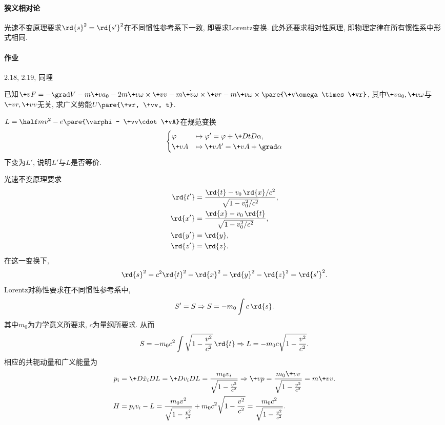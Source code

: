 \documentclass[../LectureNotes.tex]{subfiles}
\begin{document}

\paragraph{狭义相对论} %
\label{par:狭义相对论}

光速不变原理要求$\rd{s}^2 = \rd{s'}^2$在不同惯性参考系下一致, 即要求Lorentz变换. 此外还要求相对性原理, 即物理定律在所有惯性系中形式相同.


\paragraph{作业} %
\label{par:作业}

2.18, 2.19, 同埋
\begin{ex}
    已知$\+vF = -\grad V - m\+va_0 - 2m\+v\omega\times\+vv - m\dot{\+v\omega}\times\+vr - m\+v\omega\times\pare{\+v\omega \times\+vr}$, 其中$\+va_0, \+v\omega$与$\+vr, \+vv$无关, 求广义势能$U\pare{\+vr, \+vv, t}$.
\end{ex}
\begin{ex}
    $L = \displaystyle \half mv^2 - e\pare{\varphi - \+vv\cdot\+vA}$在规范变换
    \[ \begin{cases}
        \varphi &\mapsto \varphi' = \varphi + \displaystyle \+DtD\alpha,\\
        \+vA &\mapsto \+vA' = \+vA + \grad \alpha
    \end{cases} \]
    下变为$L'$, 说明$L'$与$L$是否等价.
\end{ex}
光速不变原理要求
\begin{align*}
    \rd{t'} &= \frac{\rd{t} - v_0 \,\rd{x} / c^2}{\sqrt{1-v_0^2/c^2}}, \\
    \rd{x'} &= \frac{\rd{x} - v_0 \,\rd{t}}{\sqrt{1-v_0^2/c^2}}, \\
    \rd{y'} &= \rd{y}, \\
    \rd{z'} &= \rd{z}.
\end{align*}
在这一变换下,
\[ \rd{s}^2 = c^2 \rd{t}^2 - \rd{x}^2 - \rd{y}^2 - \rd{z}^2 = \rd{s'}^2. \]
Lorentz对称性要求在不同惯性参考系中,
\[ S' = S \Rightarrow S = -m_0\int c\, \rd{s}. \]
其中$m_0$为力学意义所要求, $c$为量纲所要求. 从而
\[ S = -m_0 c^2 \int \sqrt{1-\frac{v^2}{c^2}}\,\rd{t} \Rightarrow L = -m_0 c \sqrt{1-\frac{v^2}{c^2}}. \]
相应的共轭动量和广义能量为
\begin{align*}
    p_i &= \+D{\dot{x}_i}DL = \+D{v_i}DL = \frac{m_0v_i}{\sqrt{1-\frac{v^2}{c^2}}} \Rightarrow \+vp = \frac{m_0\+vv}{\sqrt{1-\frac{v^2}{c^2}}} = m\+vv. \\
    H &= p_iv_i - L = \frac{m_0v^2}{\sqrt{1-\frac{v^2}{c^2}}} + m_0c^2\sqrt{1-\frac{v^2}{c^2}} = \frac{m_0c^2}{\sqrt{1-\frac{v^2}{c^2}}}.
\end{align*}
\end{document}
